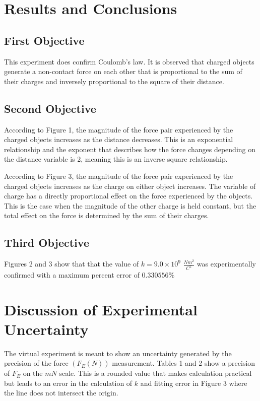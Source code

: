 \documentclass{article}
\begin{document}

\section{Results and Conclusions}

\subsection{First Objective}%
\label{sub:first_objective}

This experiment does confirm Coulomb's law. It is observed that charged objects generate a non-contact force
on each other that is proportional to the sum of their charges and inversely proportional to
the square of their distance.

\subsection{Second Objective}%
\label{sub:second_objective}

According to Figure 1, the magnitude of the force pair experienced by the charged objects increases
as the distance decreases. This is an exponential relationship and the exponent that describes how the
force changes depending on the distance variable is 2, meaning this is an inverse square relationship.

According to Figure 3, the magnitude of the force pair experienced by the charged objects increases as the
charge on either object increases. The variable of charge has a directly proportional effect on the
force experienced by the objects. This is the case when the magnitude of the other charge is held constant,
but the total effect on the force is determined by the sum of their charges.

\subsection{Third Objective}%
\label{sub:third_objective}

Figures 2 and 3 show that that the value of $k = 9.0\times 10^{9}$ $\frac{Nm^2}{C^2}$ was experimentally
confirmed with a maximum percent error of $0.330556\%$


\section{Discussion of Experimental Uncertainty}

The virtual experiment is meant to show an uncertainty generated by the precision of the force $(F_{E}(N))$
measurement. Tables 1 and 2 show a precision of $F_{E}$ on the $mN$ scale. This is a rounded value that makes
calculation practical but leads to an error in the calculation of $k$ and fitting error in Figure 3 where
the line does not intersect the origin.
\end{document}
